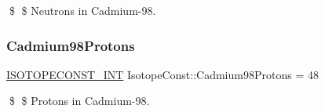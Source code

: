 \$ \$ Neutrons in Cadmium-\/98. \mbox{\label{group___isotope_const-_cadmium-_cd98_gab0c5695659c59ea95c32761446cf353d}} 
\subsubsection{\texorpdfstring{Cadmium98\+Protons}{Cadmium98Protons}}
{\footnotesize\ttfamily \mbox{\hyperlink{group___isotope_const-_macros_ga5f18360b3e99483a35c32d789e62621c}{I\+S\+O\+T\+O\+P\+E\+C\+O\+N\+S\+T\+\_\+\+I\+NT}} Isotope\+Const\+::\+Cadmium98\+Protons = 48}

\$ \$ Protons in Cadmium-\/98. 